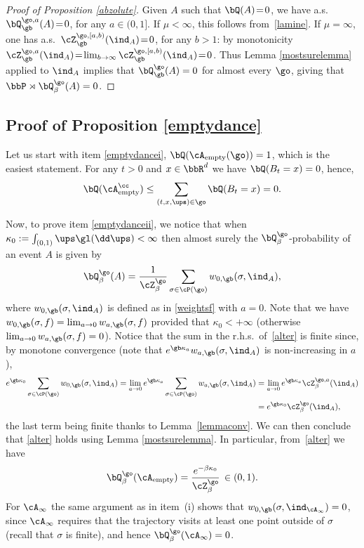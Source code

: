 \begin{proof}[Proof of Proposition \ref{abzolute}]
Given $A$ such that $\bQ(A)\!=\!0$, we have a.s.\ \hbox{$\bQ^{\go,a}_{\gb}(A)\!=\!0$}, for any $a\in (0,1]$.
If $\mu<\infty$, this follows from~\eqref{lamine}. If $\mu=\infty$, one has a.s.\ $\cZ^{\go,[a,b)}_{\gb} (\ind_A)\!=\!0$, for any $b\!>\!1$: by monotonicity $\cZ^{\go,a}_{\gb} (\ind_A) \!=\!\lim_{b\to\infty} \cZ^{\go,[a,b)}_{\gb} (\ind_A)\!=\!0$.
Thus Lemma \ref{mostsurelemma} applied to $\ind_A$ implies that $\bQ^{\go}_{\gb}(A)=0$ for almost every $\go$, giving that $\bbP \rtimes\bQ^{\go}_{\beta}(A)=0$.
\end{proof}

\subsection{Proof of Proposition \ref{emptydance}}
\label{sec:emptydance}

Let us start with item \eqref{emptydancei},
$\bQ(\cA_{\mathrm{empty}}(\go))=1$,
which is the easiest statement.
For any $t>0$ and $x\in \bbR^d$ we have $\bQ(B_t=x)=0$,
hence,
\begin{equation}
\bQ(\cA^{\cc}_{\mathrm{empty}})\le \sum_{(t,x,\ups)\in \go }\bQ(B_t=x)=0.
\end{equation}

Now, to prove item \eqref{emptydanceii}, we notice that when $\kappa_0 :=\int_{(0,1)} \ups \gl(\dd \ups)<\infty$ then almost surely
the $\bQ^{\go}_\beta$-probability of an event $A$ is given by
\begin{equation}\label{alter}
\bQ^{\go}_\beta(A)=\frac{1}{\cZ^{\go}_{\beta}}\sum_{\sigma\in \cP(\go)} w_{0,\gb}(\sigma,\ind_A),
\end{equation}
where $w_{0,\gb}(\sigma,\ind_A)$ is defined as in \eqref{weightsf} with $a=0$. Note that we have $w_{0,\gb}(\sigma,f) =\lim_{a\to 0} w_{a,\gb}(\sigma,f)$ provided that $\kappa_0<+\infty$ (otherwise $\lim_{a\to 0} w_{a,\gb}(\sigma,f)=0$).
Notice that the sum in the r.h.s.\ of~\eqref{alter} is finite since,
by monotone convergence (note that $e^{\gb \kappa_a} w_{a,\gb}(\sigma,\ind_A)$ is non-increasing in $a$),
\[
\begin{split}
e^{\gb\kappa_0} \sum_{\sigma\in \cP(\go)} w_{0,\gb}(\sigma,\ind_A) = \lim_{a\to 0} e^{\gb\kappa_a} \sum_{\sigma\in \cP(\go)} w_{a,\gb}(\sigma,\ind_A)
& =\lim_{a\to 0} e^{\gb\kappa_a} \cZ^{\go,a}_{\beta} (\ind_A) \\
& = e^{\gb \kappa_0} \cZ^{\go}_{\beta} (\ind_A),
\end{split}
\]
the last term being finite thanks to Lemma~\ref{lemmaconv}. We can then conclude that \eqref{alter} holds using Lemma \ref{mostsurelemma}.
In particular, from~\eqref{alter} we have
\begin{equation}
\bQ^{\go}_\beta(\cA_{\mathrm{empty}})= \frac{e^{-\beta \kappa_0}}{\cZ^{\go}_{\beta}}\, \in (0,1).
\end{equation}
For $\cA_{\infty}$ the same argument as in item~(i) shows that $w_{0,\gb}(\sigma,\ind_{\cA_{\infty}})=0$, since $\cA_{\infty}$ requires that the trajectory visits at least one point outside of $\sigma$ (recall that $\sigma$ is finite), and hence $\bQ^{\go}_\beta(\cA_{\mathrm{\infty}})=0$.


